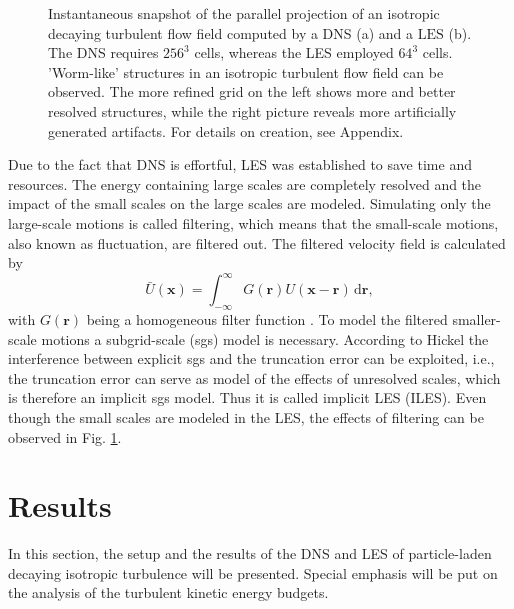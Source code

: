 \documentclass[11pt,a4paper,openany,oneside,parskip=half*]{article}
\renewcommand*\vec[1]{\boldsymbol{#1}}
\begin{document}
\begin{figure}[h]
\begin{minipage}[t]{0.5\textwidth}
        \label{64_velocity}
    \end{minipage}
    \captionsetup{width=0.97\linewidth}
\caption{Instantaneous snapshot of the parallel projection of an isotropic decaying turbulent flow field computed by a DNS (a) and a $\mathrm{LES}$ (b). The DNS requires $256^3$ cells, whereas the LES employed $64^3$ cells. 'Worm-like' structures in an isotropic turbulent flow field can be observed. The more refined grid on the left shows more and better resolved structures, while the right picture reveals more artificially generated artifacts. For details on creation, see Appendix.}
\label{comparisonLESDNS}
\end{figure}
Due to the fact that DNS is effortful, LES was established to save time and resources. The energy containing large scales are completely resolved and the impact of the small scales on the large scales are modeled.
\newline
Simulating only the large-scale motions is called filtering, which means that the small-scale motions, also known as fluctuation, are filtered out. The filtered velocity field is calculated by 
\begin{equation}
\bar U(\vec{x}) = \int_{-\infty}^{\infty} G(\vec{r})U(\vec{x} - \vec{r})  \, \mathrm{d}\vec{r},
\end{equation}
with $G(\vec{r}) $ being a homogeneous filter function \cite{turbulentFlows}. To model the filtered smaller-scale motions a subgrid-scale (sgs) model is necessary. According to Hickel \cite{implicitLES} the interference between explicit sgs and the truncation error can be exploited, i.e., the truncation error can serve as model of the effects of unresolved scales, which is therefore an implicit sgs model. Thus it is called implicit LES (ILES).
\newline
Even though the small scales are modeled in the LES, the effects of filtering can be observed in Fig. \ref{comparisonLESDNS}.
\newline
\pagebreak
\section{Results}
In this section, the setup and the results of the DNS and LES of particle-laden decaying isotropic turbulence will be presented. Special emphasis will be put on the analysis of the turbulent kinetic energy budgets.
\newline
\end{document}
